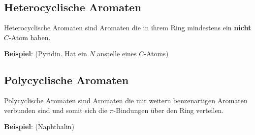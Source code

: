 \subsection{Heterocyclische Aromaten} 
\label{sec:heteroaromaten}
Heterocyclische Aromaten sind Aromaten die in ihrem Ring mindestens ein \textbf{nicht} $C$-Atom haben.

\textbf{Beispiel}: (Pyridin. Hat ein $N$ anstelle eines $C$-Atoms) 



\subsection{Polycyclische Aromaten} 
\label{sec:polyaromaten}
Polycyclische Aromaten sind Aromaten die mit weitern benzenartigen Aromaten verbunden sind und somit sich die $\pi$-Bindungen über den Ring verteilen.

\textbf{Beispiel}: (Naphthalin)


